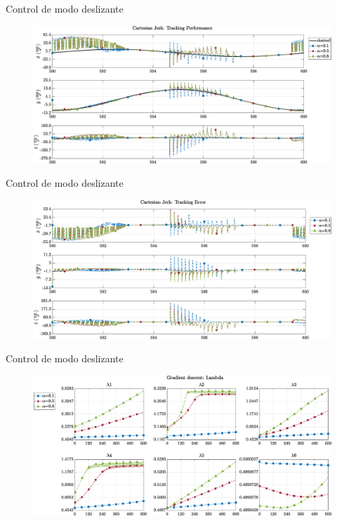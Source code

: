 \documentclass[10pt]{beamer} %
\begin{document}
	\begin{frame}[fragile]{Control de modo deslizante}
		\begin{figure}
			\centering
			\hspace*{-0.5cm}\includegraphics[width=1.1\textwidth]{img/SMCi/circular_traj/600_seg/articular_SMCi_jerk_xyz_compare.eps}
		\end{figure}
	\end{frame}
	
	\begin{frame}[fragile]{Control de modo deslizante}
		\begin{figure}
			\centering
			\hspace*{-0.5cm}\includegraphics[width=1.1\textwidth]{img/SMCi/circular_traj/600_seg/articular_SMCi_jerk_xyz_error_compare.eps}
		\end{figure}
	\end{frame}
	
	\begin{frame}[fragile]{Control de modo deslizante}
		\begin{figure}
			\centering
			\hspace*{-0.5cm}\includegraphics[width=1.1\textwidth]{img/SMCi/circular_traj/600_seg/articular_SMCi_lambda_compare.eps}
		\end{figure}
	\end{frame}
		
		
		
\end{document}
